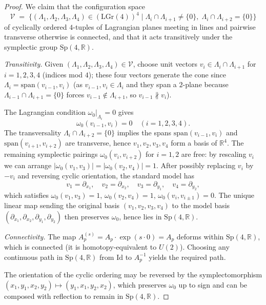 \documentclass[12pt]{article}
\theoremstyle{definition}
\begin{document}
\begin{proof}
We claim that the configuration space
\[
\mathcal{V} \;=\; \bigl\{(\Lambda_1,\Lambda_2,\Lambda_3,\Lambda_4)\in(\mathrm{LGr}(4))^4 \mid \Lambda_i\cap\Lambda_{i+1}\neq\{0\},\;\Lambda_i\cap\Lambda_{i+2}=\{0\}\bigr\}
\]
of cyclically ordered $4$-tuples of Lagrangian planes meeting in lines and pairwise transverse otherwise is connected, and that it acts transitively under the symplectic group $\mathrm{Sp}(4,\mathbb{R})$.

\smallskip\noindent\emph{Transitivity.} Given $(\Lambda_1,\Lambda_2,\Lambda_3,\Lambda_4)\in\mathcal{V}$, choose unit vectors $v_i\in\Lambda_i\cap\Lambda_{i+1}$ for $i=1,2,3,4$ (indices mod $4$); these four vectors generate the cone since $\Lambda_i=\mathrm{span}(v_{i-1},v_i)$ (as $v_{i-1},v_i\in\Lambda_i$ and they span a $2$-plane because $\Lambda_{i-1}\cap\Lambda_{i+1}=\{0\}$ forces $v_{i-1}\notin\Lambda_{i+1}$, so $v_{i-1}\not\parallel v_i$).

The Lagrangian condition $\omega_0|_{\Lambda_i}=0$ gives
\begin{equation}\label{eq:omega-vij}
\omega_0(v_{i-1},v_i)=0 \quad (i=1,2,3,4).
\end{equation}
The transversality $\Lambda_i\cap\Lambda_{i+2}=\{0\}$ implies the spans $\mathrm{span}(v_{i-1},v_i)$ and $\mathrm{span}(v_{i+1},v_{i+2})$ are transverse, hence $v_1,v_2,v_3,v_4$ form a basis of $\mathbb{R}^4$. The remaining symplectic pairings $\omega_0(v_i,v_{i+2})$ for $i=1,2$ are free: by rescaling $v_i$ we can arrange $|\omega_0(v_1,v_3)|=|\omega_0(v_2,v_4)|=1$. After possibly replacing $v_i$ by $-v_i$ and reversing cyclic orientation, the standard model has
\[
v_1=\partial_{x_1},\quad v_2=\partial_{x_2},\quad v_3=\partial_{y_1},\quad v_4=\partial_{y_2},
\]
which satisfies $\omega_0(v_1,v_3)=1$, $\omega_0(v_2,v_4)=1$, $\omega_0(v_i,v_{i\pm 1})=0$. The unique linear map sending the original basis $(v_1,v_2,v_3,v_4)$ to the model basis $(\partial_{x_1},\partial_{x_2},\partial_{y_1},\partial_{y_2})$ then preserves $\omega_0$, hence lies in $\mathrm{Sp}(4,\mathbb{R})$.

\smallskip\noindent\emph{Connectivity.} The map $A_p^{(s)} = A_p\cdot\exp(s\cdot 0)= A_p$ deforms within $\mathrm{Sp}(4,\mathbb{R})$, which is connected (it is homotopy-equivalent to $U(2)$). Choosing any continuous path in $\mathrm{Sp}(4,\mathbb{R})$ from $\mathrm{Id}$ to $A_p^{-1}$ yields the required path.

The orientation of the cyclic ordering may be reversed by the symplectomorphism $(x_1,y_1,x_2,y_2)\mapsto(y_1,x_1,y_2,x_2)$, which preserves $\omega_0$ up to sign and can be composed with reflection to remain in $\mathrm{Sp}(4,\mathbb{R})$.
\end{proof}
\end{document}
